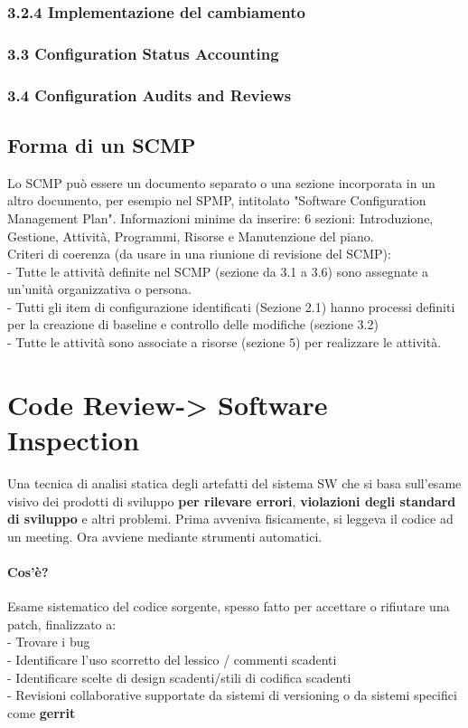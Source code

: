 \documentclass[10pt,a4paper]{book}
\begin{document}
\subsubsection{3.2.4 Implementazione del cambiamento}

\subsubsection{3.3 Configuration Status Accounting}

\subsubsection{3.4 Configuration Audits and Reviews}

\subsection{Forma di un SCMP}
Lo SCMP può essere un documento separato o una sezione incorporata in un altro documento, per esempio nel SPMP, intitolato "Software Configuration Management Plan".
Informazioni minime da inserire: 6 sezioni: Introduzione, Gestione, Attività, Programmi, Risorse e Manutenzione del piano.\\

Criteri di coerenza (da usare in una riunione di revisione del SCMP):\\
- Tutte le attività definite nel SCMP (sezione da 3.1 a 3.6) sono assegnate a un'unità organizzativa o persona.\\
- Tutti gli item di configurazione identificati (Sezione 2.1) hanno processi definiti per la creazione di baseline  e controllo delle modifiche (sezione 3.2)\\
- Tutte le attività sono associate a risorse (sezione 5) per realizzare le attività.\\

\section{Code Review-> Software Inspection}
Una tecnica di analisi statica degli artefatti del sistema SW che si basa sull'esame visivo dei prodotti di sviluppo \textbf{per rilevare errori}, \textbf{violazioni degli standard di sviluppo} e altri problemi.
Prima avveniva fisicamente, si leggeva il codice ad un meeting. Ora avviene mediante strumenti automatici.
\paragraph{Cos'è?}
Esame sistematico del codice sorgente, spesso fatto per accettare o rifiutare una patch, finalizzato a:\\
- Trovare i bug\\
- Identificare l'uso scorretto del lessico / commenti scadenti\\
- Identificare scelte di design scadenti/stili di codifica scadenti\\
- Revisioni collaborative supportate da sistemi di versioning o da sistemi specifici come \textbf{gerrit}\\
\end{document}
